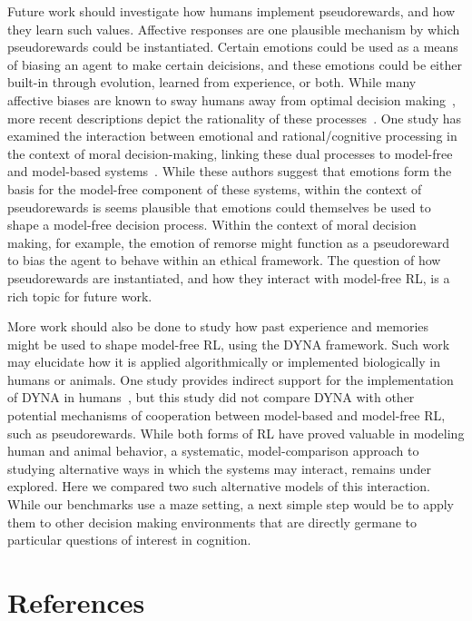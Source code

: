 \documentclass[notitlepage]{article}
\begin{document}
Future work should investigate how humans implement pseudorewards, and how they learn such values. Affective responses are one plausible mechanism by which pseudorewards could be instantiated. Certain emotions could be used as a means of biasing an agent to make certain deicisions, and these emotions could be either built-in through evolution, learned from experience, or both. While many affective biases are known to sway humans away from optimal decision making~\cite{kahneman1979prospect}, more recent descriptions depict the rationality of these processes~\cite{griffiths2008bayesian}. One study has examined the interaction between emotional and rational/cognitive processing in the context of moral decision-making, linking these dual processes to model-free and model-based systems~\cite{cushman2013action}. While these authors suggest that emotions form the basis for the model-free component of these systems, within the context of pseudorewards is seems plausible that emotions could themselves be used to shape a model-free decision process. Within the context of moral decision making, for example, the emotion of remorse might function as a pseudoreward to bias the agent to behave within an ethical framework. The question of how pseudorewards are instantiated, and how they interact with model-free RL, is a rich topic for future work.

More work should also be done to study how past experience and memories might be used to shape model-free RL, using the DYNA framework. Such work may elucidate how it is applied algorithmically or implemented biologically in humans or animals. One study provides indirect support for the implementation of DYNA in humans~\cite{gershman2014retrospective}, but this study did not compare DYNA with other potential mechanisms of cooperation between model-based and model-free RL, such as pseudorewards. While both forms of RL have proved valuable in modeling human and animal behavior, a systematic, model-comparison approach to studying alternative ways in which the systems may interact, remains under explored. Here we compared two such alternative models of this interaction. While our benchmarks use a maze setting, a next simple step would be to apply them to other decision making environments that are directly germane to particular questions of interest in cognition.

\section*{References}

{}

\end{document}
